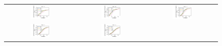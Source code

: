 \documentclass[preprintm,linenumbers]{aastex631}
\begin{document}
		\begin{figure}
			\centering
			\begin{tabular}{c c c}
				\includegraphics[width=0.3\textwidth]{results/first_year_one_snap_v4_0_10yrs_db_noDD_noTwi_doAllTemplateMetrics_reduceDeltaNight_u.pdf} &
				\includegraphics[width=0.3\textwidth]{results/first_year_one_snap_v4_0_10yrs_db_noDD_noTwi_doAllTemplateMetrics_reduceDeltaNight_g.pdf} &
				\includegraphics[width=0.3\textwidth]{results/first_year_one_snap_v4_0_10yrs_db_noDD_noTwi_doAllTemplateMetrics_reduceDeltaNight_r.pdf} \\
				\includegraphics[width=0.3\textwidth]{results/first_year_one_snap_v4_0_10yrs_db_noDD_noTwi_doAllTemplateMetrics_reduceDeltaNight_i.pdf} &
				\includegraphics[width=0.3\textwidth]{results/first_year_one_snap_v4_0_10yrs_db_noDD_noTwi_doAllTemplateMetrics_reduceDeltaNight_z.pdf} &

\end{tabular}
\end{figure}
\end{document}
